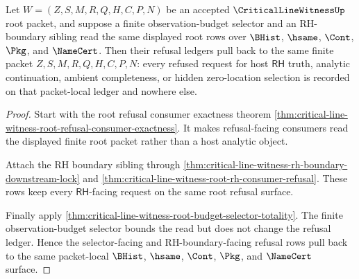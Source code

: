 \begin{theorem}
\label{thm:critical-line-witness-root-refusal-ledger-pullback}
Let $W=(Z,S,M,R,Q,H,C,P,N)$ be an accepted $\CriticalLineWitnessUp$ root packet, and suppose a finite observation-budget selector and an RH-boundary sibling read the same displayed root rows over $\BHist$, $\hsame$, $\Cont$, $\Pkg$, and $\NameCert$. Then their refusal ledgers pull back to the same finite packet $Z,S,M,R,Q,H,C,P,N$: every refused request for host $\mathsf{RH}$ truth, analytic continuation, ambient completeness, or hidden zero-location selection is recorded on that packet-local ledger and nowhere else.
\end{theorem}
\begin{proof}
Start with the root refusal consumer exactness theorem \autoref{thm:critical-line-witness-root-refusal-consumer-exactness}. It makes refusal-facing consumers read the displayed finite root packet rather than a host analytic object.

Attach the RH boundary sibling through \autoref{thm:critical-line-witness-rh-boundary-downstream-lock} and \autoref{thm:critical-line-witness-root-rh-consumer-refusal}. These rows keep every $\mathsf{RH}$-facing request on the same root refusal surface.

Finally apply \autoref{thm:critical-line-witness-root-budget-selector-totality}. The finite observation-budget selector bounds the read but does not change the refusal ledger. Hence the selector-facing and RH-boundary-facing refusal rows pull back to the same packet-local $\BHist$, $\hsame$, $\Cont$, $\Pkg$, and $\NameCert$ surface.
\end{proof}
